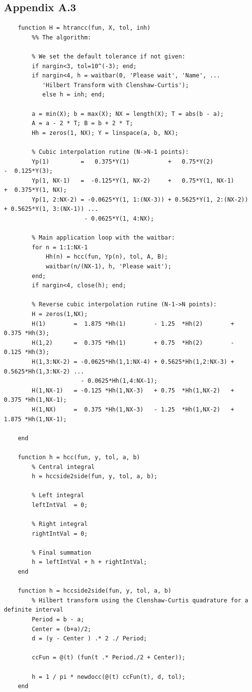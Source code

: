\documentclass[12pt,twoside,a4paper]{article}
\numberwithin{equation}{subsection}
\numberwithin{figure}{subsection}
\begin{document}
\subsection*{Appendix A.3}
\begin{lstlisting}
	function H = htrancc(fun, X, tol, inh)
	    %% The algorithm:
	    
	    % We set the default tolerance if not given:
	    if nargin<3, tol=10^(-3); end;
	    if nargin<4, h = waitbar(0, 'Please wait', 'Name', ...
	       'Hilbert Transform with Clenshaw-Curtis'); 
	       else h = inh; end;
	    
	    a = min(X); b = max(X); NX = length(X); T = abs(b - a);
	    A = a - 2 * T; B = b + 2 * T;
	    Hh = zeros(1, NX); Y = linspace(a, b, NX);
	    
	    % Cubic interpolation rutine (N->N-1 points):
	    Yp(1)         =   0.375*Y(1)           +   0.75*Y(2)           -  0.125*Y(3);
	    Yp(1, NX-1)   =  -0.125*Y(1, NX-2)     +   0.75*Y(1, NX-1)     +  0.375*Y(1, NX);
	    Yp(1, 2:NX-2) = -0.0625*Y(1, 1:(NX-3)) + 0.5625*Y(1, 2:(NX-2)) + 0.5625*Y(1, 3:(NX-1)) ...
	                   - 0.0625*Y(1, 4:NX);
	    
	    % Main application loop with the waitbar:
	    for n = 1:1:NX-1
	        Hh(n) = hcc(fun, Yp(n), tol, A, B); 
	        waitbar(n/(NX-1), h, 'Please wait');
	    end;
	    if nargin<4, close(h); end;
	    
	    % Reverse cubic interpolation rutine (N-1->N points):
	    H = zeros(1,NX);
	    H(1)        =  1.875 *Hh(1)        - 1.25  *Hh(2)        + 0.375 *Hh(3);
	    H(1,2)      =  0.375 *Hh(1)        + 0.75  *Hh(2)        - 0.125 *Hh(3);
	    H(1,3:NX-2) = -0.0625*Hh(1,1:NX-4) + 0.5625*Hh(1,2:NX-3) + 0.5625*Hh(1,3:NX-2) ...
	                  - 0.0625*Hh(1,4:NX-1);
	    H(1,NX-1)   = -0.125 *Hh(1,NX-3)   + 0.75  *Hh(1,NX-2)   + 0.375 *Hh(1,NX-1);
	    H(1,NX)     =  0.375 *Hh(1,NX-3)   - 1.25  *Hh(1,NX-2)   + 1.875 *Hh(1,NX-1);
	
	end
	
	function h = hcc(fun, y, tol, a, b)
	    % Central integral
	    h = hccside2side(fun, y, tol, a, b);
	    
	    % Left integral
	    leftIntVal  = 0;
	    
	    % Right integral
	    rightIntVal = 0;
	    
	    % Final summation
	    h = leftIntVal + h + rightIntVal;
	end
	
	function h = hccside2side(fun, y, tol, a, b)
	    % Hilbert transform using the Clenshaw-Curtis quadrature for a definite interval
	    Period = b - a;
	    Center = (b+a)/2;
	    d = (y - Center ) .* 2 ./ Period;
	   
	    ccFun = @(t) (fun(t .* Period./2 + Center));
	    
	    h = 1 / pi * newdocc(@(t) ccFun(t), d, tol);
	end
\end{lstlisting}
\end{document}
